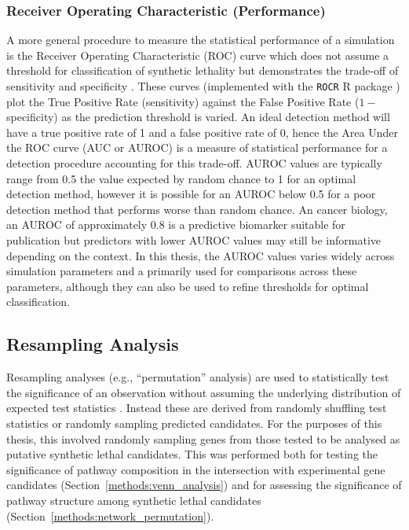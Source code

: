 \subsubsection{Receiver Operating Characteristic (Performance)}
A more general procedure to measure the statistical performance of a simulation is the Receiver Operating Characteristic (ROC) curve which does not assume a threshold for classification of synthetic lethality but demonstrates the trade-off of sensitivity and specificity \citep{Zweig1993, Fawcett2006, Akobeng2007}. These curves (implemented with the \texttt{ROCR} R package \citep{ROCR}) plot the True Positive Rate (sensitivity) against the False Positive Rate ($1-$specificity) as the prediction threshold is varied. An ideal detection method will have a true positive rate of 1 and a false positive rate of 0, hence the Area Under the ROC curve (AUC or AUROC) is a measure of statistical performance for a detection procedure accounting for this trade-off. AUROC values are typically range from 0.5 the value expected by random chance to 1 for an optimal detection method, however it is possible for an AUROC below 0.5 for a poor detection method that performs worse than random chance. An cancer biology, an AUROC of approximately $0.8$ is a predictive biomarker suitable for publication \citep{Hajian-Tilaki2013} but predictors with lower AUROC values may still be informative depending on the context. In this thesis, the AUROC values varies widely across simulation parameters and a primarily used for comparisons across these parameters, although they can also be used to refine thresholds for optimal classification. 

\subsection{Resampling Analysis} \label{methods:permutation}
Resampling analyses (e.g., ``permutation'' analysis) are used to statistically test the significance of an observation without assuming the underlying distribution of expected test statistics \citet{Collingridge2013}. Instead these are derived from randomly shuffling test statistics or randomly sampling predicted candidates. For the purposes of this thesis, this involved randomly sampling genes from those tested to be analysed as putative synthetic lethal candidates. This was performed both for testing the significance of pathway composition in the intersection with experimental gene candidates (Section~\ref{methods:venn_analysis}) and for assessing the significance of pathway structure among synthetic lethal candidates (Section~\ref{methods:network_permutation}).

